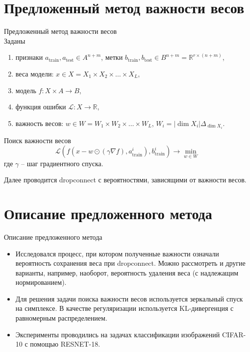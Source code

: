 \documentclass[10pt,pdf,hyperref={unicode}]{beamer}
\begin{document}
\section{Предложенный метод важности весов}
\begin{frame}{Предложенный метод важности весов}
~\\[-1mm]
Заданы
\begin{enumerate}[1)]
    \item признаки $a_\text{train}, a_\text{test} \in A^{n+m}$, метки $b_\text{train}, b_\text{test} \in B^{n+m} = \mathbb{R}^{r \times (n+m)}$,
    \item веса модели: $x \in X = X_1 \times X_2 \times \ldots \times X_L$,
    \item модель $f: X \times A \to B$,
    \item функция ошибки $\mathcal{L}: X \to \mathbb{R}$,
    \item важность весов: $w \in W = W_1 \times W_2 \times \ldots \times W_L$, $ W_i = |\dim X_i |\Delta_{\dim X_i}$.
\end{enumerate}

\bigskip

Поиск важности весов
\[
	\mathcal{L}(f(x -  w \odot (\gamma \nabla f), a_\text{train}^i), b_\text{train}^i) \to \min_{w \in W}
\]
где $\gamma$ -- шаг градиентного спуска.

\bigskip

Далее проводится dropconnect с вероятностями, зависящими от важности весов.

\cite{keshari2019guided}
\end{frame}

\section{Описание предложенного метода}
\begin{frame}{Описание предложенного метода}
\justifying
\begin{itemize}
\item Исследовался процесс, при котором полученные важности означали вероятность сохранения веса при dropconnect. Можно рассмотреть и другие варианты, например, наоборот, вероятность удаления веса (с надлежащим нормированием).
\item Для решения задачи поиска важности весов используется зеркальный спуск на симплексе. В качестве регуляризации используется KL-дивергенция с равномерным распределением.
\item  Эксперименты проводились на задачах классификации изображений CIFAR-10 с помощью RESNET-18.
\end{itemize}

\end{frame}
\end{document}
